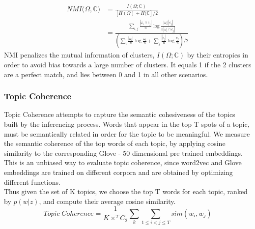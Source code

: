 \documentclass{sig-alternate-05-2015}
\begin{document}
\begin{align*}
NMI(\Omega, \mathbb{C)} &= \frac{I(\Omega ; \mathbb{C})}{\left[ H(\Omega) + H (\mathbb{C} \right] /2} \\[5pt]
&= \frac{ \sum_{i, j} \frac{| \omega_i \cap c_j|}{n} \log \frac{|\omega_i| |c_j|}
{n |\omega_i \cap c_j|} }{(\sum_i \frac{|\omega_i|}{n} \log \frac{\omega_i}{n} + \sum_j \frac{|c_j|}{n} \log \frac{c_j}{n})/2}
\end{align*}
NMI penalizes the mutual information of clusters, $I(\Omega ; \mathbb{C})$ by their entropies in order to avoid bias towards a large number of clusters. It equals 1 if the 2 clusters are a perfect match, and lies between 0 and 1 in all other scenarios.
\subsubsection{Topic Coherence}
Topic Coherence attempts to capture the semantic cohesiveness of the topics built by the inferencing process. Words that appear in the top T spots of a topic, must be semantically related in order for the topic to be meaningful. We measure the semantic coherence of the top words of each topic, by applying cosine similarity to the corresponding Glove - 50 dimensional pre trained embeddings. This is an unbiased way to evaluate topic coherence, since word2vec and Glove embeddings are trained on different corpora and are obtained by optimizing different functions.
\\
Thus given the set of K topics, we choose the top T words for each topic, ranked by $p(w|z)$, and compute their average cosine similarity.
$$Topic \;Coherence = \frac{1}{K \times ^{T}C_{2}}\sum_{k}\sum_{1 \leq i < j \leq T}sim(w_{i}, w_{j})$$


%

%
%




\end{document}
